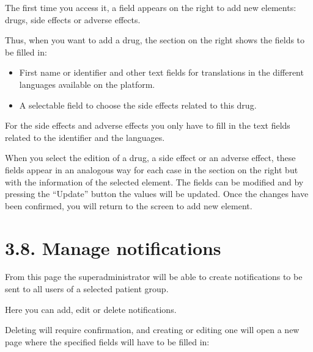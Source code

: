 \documentclass[letterpaper,10pt,english]{sphinxmanual}
\begin{document}
The first time you access it, a field appears on the right to add new elements: drugs, side effects or adverse effects.

Thus, when you want to add a drug, the section on the right shows the fields to be filled in:
\begin{itemize}
\item {} 
First name or identifier and other text fields for translations in the different languages available on the platform.

\item {} 
A selectable field to choose the side effects related to this drug.

\end{itemize}

For the side effects and adverse effects you only have to fill in the text fields related to the identifier and the languages.

When you select the edition of a drug, a side effect or an adverse effect, these fields appear in an analogous way for each case in the section on the right but with the information of the selected element. The fields can be modified and by pressing the “Update” button the values will be updated. Once the changes have been confirmed, you will return to the screen to add new element.


\section{3.8. Manage notifications}
\label{\detokenize{pages/Superadmin profile:manage-notifications}}


From this page the superadministrator will be able to create notifications to be sent to all users of a selected patient group.



Here you can add, edit or delete notifications.

Deleting will require confirmation, and creating or editing one will open a new page where the specified fields will have to be filled in:
\end{document}
